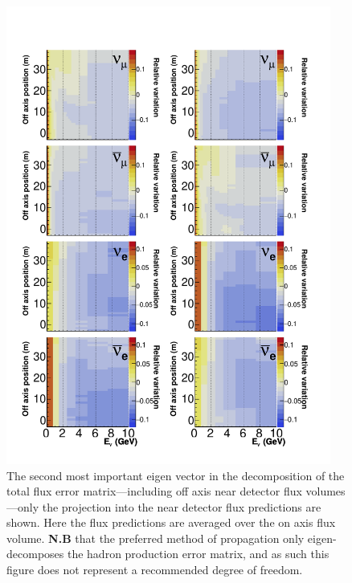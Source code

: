 \documentclass{article}
\begin{document}
\begin{figure}
  \centering
  \includegraphics[width=0.95\textwidth]{plots/EvUncerts_offaxis_component_1}
  \caption{The second most important eigen vector in the decomposition of the total flux error matrix---including off axis near detector flux volumes---only the projection into the near detector flux predictions are shown. Here the flux predictions are averaged over the on axis flux volume. \textbf{N.B} that the preferred method of propagation only eigen-decomposes the hadron production error matrix, and as such this figure does not represent a recommended degree of freedom.}
  \label{fig:evfreedom_offaxis_c1}
\end{figure}
\end{document}
